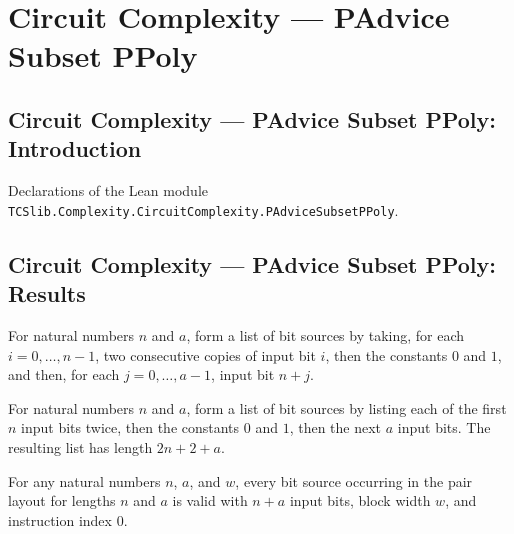 \section{Circuit Complexity --- PAdvice Subset PPoly}
\subsection*{Circuit Complexity --- PAdvice Subset PPoly: Introduction}

Declarations of the Lean module \texttt{TCSlib.Complexity.CircuitComplexity.PAdviceSubsetPPoly}.

\subsection*{Circuit Complexity --- PAdvice Subset PPoly: Results}

\begin{definition}
\label{Complexity.pairLayout}
\leanok
{}
For natural numbers $n$ and $a$, form a list of bit sources by taking, for each
$i=0,\ldots,n-1$, two consecutive copies of input bit $i$, then the constants $0$ and
$1$, and then, for each $j=0,\ldots,a-1$, input bit $n+j$.
\end{definition}

\begin{theorem}
\label{Complexity.length_pairLayout}
\leanok
{}
For natural numbers $n$ and $a$, form a list of bit sources by listing each of the first
$n$ input bits twice, then the constants $0$ and $1$, then the next $a$ input bits. The
resulting list has length $2n+2+a$.
\end{theorem}

\begin{theorem}
\label{Complexity.pairLayout_valid}
\leanok
{}
For any natural numbers $n$, $a$, and $w$, every bit source occurring in the pair layout
for lengths $n$ and $a$ is valid with $n+a$ input bits, block width $w$, and instruction
index $0$.
\end{theorem}

